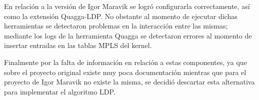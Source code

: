En relaci\'on a la versi\'on de Igor Maravik se logr\'o configurarla correctamente, as\'i como la extensi\'on Quagga-LDP. No obstante al momento de ejecutar dichas herramientas se detectaron problemas en la interacci\'on entre las mismas; mediante los logs de la herramienta Quagga se detectaron errores al momento de insertar entradas en las tablas MPLS del kernel.

Finalmente por la falta de información en relación a estas componentes, ya que sobre el proyecto original existe muy poca documentaci\'on mientras que para el proyecto de Igor Maravik no existe la misma, se decidi\'o descartar esta alternativa para implementar el algoritmo LDP. 








